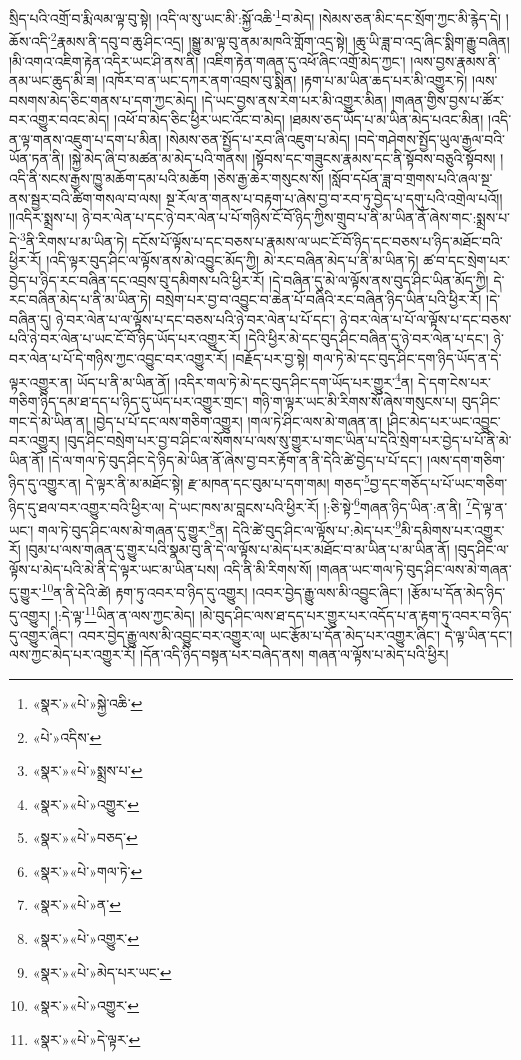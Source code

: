 སྲིད་པའི་འགྲོ་བ་རྨི་ལམ་ལྟ་བུ་སྟེ། །འདི་ལ་སུ་ཡང་མི་:སྐྱོ་འཆི་\footnote{«སྣར་»«པེ་»སྐྱེ་འཆི་}བ་མེད། །སེམས་ཅན་མིང་དང་སྲོག་ཀྱང་མི་རྙེད་དེ། །ཆོས་འདི་\footnote{«པེ་»འདིས་}རྣམས་ནི་དབུ་བ་ཆུ་ཤིང་འདྲ། །སྒྱུ་མ་ལྟ་བུ་ནམ་མཁའི་གློག་འདྲ་སྟེ། །ཆུ་ཡི་ཟླ་བ་འདྲ་ཞིང་སྨིག་རྒྱུ་བཞིན། །མི་འགའ་འཇིག་རྟེན་འདིར་ཡང་ཤི་ནས་ནི། །འཇིག་རྟེན་གཞན་དུ་འཕོ་ཞིང་འགྲོ་མེད་ཀྱང་། །ལས་བྱས་རྣམས་ནི་ནམ་ཡང་ཆུད་མི་ཟ། །འཁོར་བ་ན་ཡང་དཀར་ནག་འབྲས་བུ་སྨིན། །རྟག་པ་མ་ཡིན་ཆད་པར་མི་འགྱུར་ཏེ། །ལས་བསགས་མེད་ཅིང་གནས་པ་དག་ཀྱང་མེད། །དེ་ཡང་བྱས་ནས་རེག་པར་མི་འགྱུར་མིན། །གཞན་གྱིས་བྱས་པ་ཚོར་བར་འགྱུར་བའང་མེད། །འཕོ་བ་མེད་ཅིང་ཕྱིར་ཡང་འོང་བ་མེད། །ཐམས་ཅད་ཡོད་པ་མ་ཡིན་མེད་པའང་མིན། །འདི་ན་ལྟ་གནས་འཇུག་པ་དག་པ་མིན། །སེམས་ཅན་སྤྱོད་པ་རབ་ཞི་འཇུག་པ་མེད། །བདེ་གཤེགས་སྤྱོད་ཡུལ་རྒྱལ་བའི་ཡོན་ཏན་ནི། །སྐྱེ་མེད་ཞི་བ་མཚན་མ་མེད་པའི་གནས། །སྟོབས་དང་གཟུངས་རྣམས་དང་ནི་སྟོབས་བཅུའི་སྟོབས། །འདི་ནི་སངས་རྒྱས་ཁྱུ་མཆོག་དམ་པའི་མཆོག །ཅེས་རྒྱ་ཆེར་གསུངས་སོ། །སློབ་དཔོན་ཟླ་བ་གྲགས་པའི་ཞལ་སྔ་ནས་སྦྱར་བའི་ཚིག་གསལ་བ་ལས། སྔ་རོལ་ན་གནས་པ་བརྟག་པ་ཞེས་བྱ་བ་རབ་ཏུ་བྱེད་པ་དགུ་པའི་འགྲེལ་པའོ།། །།འདིར་སྨྲས་པ། ཉེ་བར་ལེན་པ་དང་ཉེ་བར་ལེན་པ་པོ་གཉིས་ངོ་བོ་ཉིད་ཀྱིས་གྲུབ་པ་ནི་མ་ཡིན་ནོ་ཞེས་གང་:སྨྲས་པ་དེ་\footnote{«སྣར་»«པེ་»སྨྲས་པ་}ནི་རིགས་པ་མ་ཡིན་ཏེ། དངོས་པོ་ལྟོས་པ་དང་བཅས་པ་རྣམས་ལ་ཡང་ངོ་བོ་ཉིད་དང་བཅས་པ་ཉིད་མཐོང་བའི་ཕྱིར་རོ། །འདི་ལྟར་བུད་ཤིང་ལ་ལྟོས་ནས་མེ་འབྱུང་མོད་ཀྱི། མེ་རང་བཞིན་མེད་པ་ནི་མ་ཡིན་ཏེ། ཚ་བ་དང་སྲེག་པར་བྱེད་པ་ཉིད་རང་བཞིན་དང་འབྲས་བུ་དམིགས་པའི་ཕྱིར་རོ། །དེ་བཞིན་དུ་མེ་ལ་ལྟོས་ནས་བུད་ཤིང་ཡིན་མོད་ཀྱི། དེ་རང་བཞིན་མེད་པ་ནི་མ་ཡིན་ཏེ། བསྲེག་པར་བྱ་བ་འབྱུང་བ་ཆེན་པོ་བཞིའི་རང་བཞིན་ཉིད་ཡིན་པའི་ཕྱིར་རོ། །དེ་བཞིན་དུ། ཉེ་བར་ལེན་པ་ལ་ལྟོས་པ་དང་བཅས་པའི་ཉེ་བར་ལེན་པ་པོ་དང་། ཉེ་བར་ལེན་པ་པོ་ལ་ལྟོས་པ་དང་བཅས་པའི་ཉེ་བར་ལེན་པ་ཡང་ངོ་བོ་ཉིད་ཡོད་པར་འགྱུར་རོ། །དེའི་ཕྱིར་མེ་དང་བུད་ཤིང་བཞིན་དུ་ཉེ་བར་ལེན་པ་དང་། ཉེ་བར་ལེན་པ་པོ་དེ་གཉིས་ཀྱང་འབྱུང་བར་འགྱུར་རོ། །བརྗོད་པར་བྱ་སྟེ། གལ་ཏེ་མེ་དང་བུད་ཤིང་དག་ཉིད་ཡོད་ན་དེ་ལྟར་འགྱུར་ན། ཡོད་པ་ནི་མ་ཡིན་ནོ། །འདིར་གལ་ཏེ་མེ་དང་བུད་ཤིང་དག་ཡོད་པར་གྱུར་\footnote{«སྣར་»«པེ་»འགྱུར་}ན། དེ་དག་ངེས་པར་གཅིག་ཉིད་དམ་ཐ་དད་པ་ཉིད་དུ་ཡོད་པར་འགྱུར་གྲང་། གཉི་ག་ལྟར་ཡང་མི་རིགས་སོ་ཞེས་གསུངས་པ། བུད་ཤིང་གང་དེ་མེ་ཡིན་ན། །བྱེད་པ་པོ་དང་ལས་གཅིག་འགྱུར། །གལ་ཏེ་ཤིང་ལས་མེ་གཞན་ན། །ཤིང་མེད་པར་ཡང་འབྱུང་བར་འགྱུར། །བུད་ཤིང་བསྲེག་པར་བྱ་བ་ཤིང་ལ་སོགས་པ་ལས་སུ་གྱུར་པ་གང་ཡིན་པ་དེའི་སྲེག་པར་བྱེད་པ་པོ་ནི་མེ་ཡིན་ནོ། །དེ་ལ་གལ་ཏེ་བུད་ཤིང་དེ་ཉིད་མེ་ཡིན་ནོ་ཞེས་བྱ་བར་རྟོག་ན་ནི་དེའི་ཚེ་བྱེད་པ་པོ་དང་། །ལས་དག་གཅིག་ཉིད་དུ་འགྱུར་ན། དེ་ལྟར་ནི་མ་མཐོང་སྟེ། རྫ་མཁན་དང་བུམ་པ་དག་གམ། གཅད་\footnote{«སྣར་»«པེ་»བཅད་}བྱ་དང་གཅོད་པ་པོ་ཡང་གཅིག་ཉིད་དུ་ཐལ་བར་འགྱུར་བའི་ཕྱིར་ལ། དེ་ཡང་ཁས་མ་བླངས་པའི་ཕྱིར་རོ། །:ཅི་སྟེ་\footnote{«སྣར་»«པེ་»གལ་ཏེ་}གཞན་ཉིད་ཡིན་:ན་ནི། \footnote{«སྣར་»«པེ་»ན་}དེ་ལྟ་ན་ཡང་། གལ་ཏེ་བུད་ཤིང་ལས་མེ་གཞན་དུ་གྱུར་\footnote{«སྣར་»«པེ་»འགྱུར་}ན། དེའི་ཚེ་བུད་ཤིང་ལ་ལྟོས་པ་:མེད་པར་\footnote{«སྣར་»«པེ་»མེད་པར་ཡང་}མི་དམིགས་པར་འགྱུར་རོ། །བུམ་པ་ལས་གཞན་དུ་གྱུར་པའི་སྣམ་བུ་ནི་དེ་ལ་ལྟོས་པ་མེད་པར་མཐོང་བ་མ་ཡིན་པ་མ་ཡིན་ནོ། །བུད་ཤིང་ལ་ལྟོས་པ་མེད་པའི་མེ་ནི་དེ་ལྟར་ཡང་མ་ཡིན་པས། འདི་ནི་མི་རིགས་སོ། །གཞན་ཡང་གལ་ཏེ་བུད་ཤིང་ལས་མེ་གཞན་དུ་གྱུར་\footnote{«སྣར་»«པེ་»འགྱུར་}ན་ནི་དེའི་ཚེ། རྟག་ཏུ་འབར་བ་ཉིད་དུ་འགྱུར། །འབར་བྱེད་རྒྱུ་ལས་མི་འབྱུང་ཞིང་། །རྩོམ་པ་དོན་མེད་ཉིད་དུ་འགྱུར། །:དེ་ལྟ་\footnote{«སྣར་»«པེ་»དེ་ལྟར་}ཡིན་ན་ལས་ཀྱང་མེད། །མེ་བུད་ཤིང་ལས་ཐ་དད་པར་གྱུར་པར་འདོད་པ་ན་རྟག་ཏུ་འབར་བ་ཉིད་དུ་འགྱུར་ཞིང་། འབར་བྱེད་རྒྱུ་ལས་མི་འབྱུང་བར་འགྱུར་ལ། ཡང་རྩོམ་པ་དོན་མེད་པར་འགྱུར་ཞིང་། དེ་ལྟ་ཡིན་དང་། ལས་ཀྱང་མེད་པར་འགྱུར་རོ། །དོན་འདི་ཉིད་བསྟན་པར་བཞེད་ནས། གཞན་ལ་ལྟོས་པ་མེད་པའི་ཕྱིར། 
